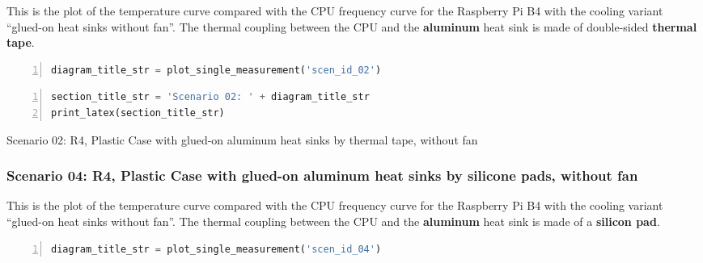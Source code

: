 \documentclass[10pt,parskip=half,
toc=sectionentrywithdots,
bibliography=totocnumbered,
captions=tableheading,numbers=noendperiod]{scrartcl}
\begin{document}
This is the plot of the temperature curve compared with the CPU
frequency curve for the Raspberry Pi B4 with the cooling variant
``glued-on heat sinks without fan''. The thermal coupling between the
CPU and the \textbf{aluminum} heat sink is made of double-sided
\textbf{thermal tape}.

\begin{lstlisting}[language=Python,numbers=left,xleftmargin=20pt,xrightmargin=5pt,belowskip=5pt,aboveskip=5pt]
diagram_title_str = plot_single_measurement('scen_id_02')
\end{lstlisting}

\begin{figure}[H]\begin{center}\end{center}\end{figure}

\begin{lstlisting}[language=Python,numbers=left,xleftmargin=20pt,xrightmargin=5pt,belowskip=5pt,aboveskip=5pt]
section_title_str = 'Scenario 02: ' + diagram_title_str
print_latex(section_title_str)
\end{lstlisting}

\begin{table}[H]
\centering
\begin{adjustbox}{max width=\textwidth}
Scenario 02: R4, Plastic Case with glued-on aluminum heat sinks by thermal tape, without fan
\end{adjustbox}
\end{table}

\hypertarget{scenario-04-r4-plastic-case-with-glued-on-aluminum-heat-sinks-by-silicone-pads-without-fan}{%
\subsubsection{Scenario 04: R4, Plastic Case with glued-on aluminum heat
sinks by silicone pads, without
fan}\label{scenario-04-r4-plastic-case-with-glued-on-aluminum-heat-sinks-by-silicone-pads-without-fan}}

This is the plot of the temperature curve compared with the CPU
frequency curve for the Raspberry Pi B4 with the cooling variant
``glued-on heat sinks without fan''. The thermal coupling between the
CPU and the \textbf{aluminum} heat sink is made of a \textbf{silicon
pad}.

\begin{lstlisting}[language=Python,numbers=left,xleftmargin=20pt,xrightmargin=5pt,belowskip=5pt,aboveskip=5pt]
diagram_title_str = plot_single_measurement('scen_id_04')
\end{lstlisting}
\end{document}
